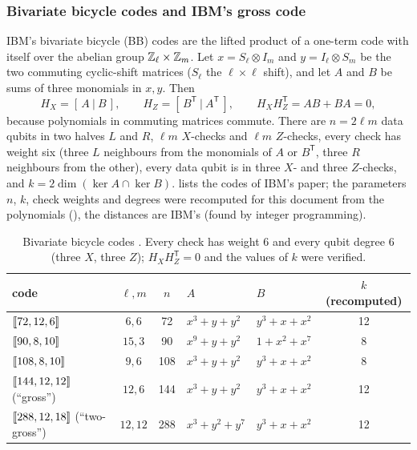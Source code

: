\subsubsection{Bivariate bicycle codes and IBM's gross code}\label{sec:bb}
IBM's bivariate bicycle (BB) codes \cite{bravyi24gross} are the lifted product of a one-term code with itself over the abelian group $\mathbb{Z}_\ell\times\mathbb{Z}_m$. Let $x=S_\ell\otimes I_m$ and $y=I_\ell\otimes S_m$ be the two commuting cyclic-shift matrices ($S_\ell$ the $\ell\times\ell$ shift), and let $A$ and $B$ be sums of three monomials in $x,y$. Then
\begin{equation}\label{eq:bb}
H_X=[\,A\ |\ B\,],\qquad H_Z=[\,B^{\mathsf T}\ |\ A^{\mathsf T}\,],\qquad H_XH_Z^{\mathsf T}=AB+BA=0,
\end{equation}
because polynomials in commuting matrices commute. There are $n=2\ell m$ data qubits in two halves $L$ and $R$, $\ell m$ $X$-checks and $\ell m$ $Z$-checks, every check has weight six (three $L$ neighbours from the monomials of $A$ or $B^{\mathsf T}$, three $R$ neighbours from the other), every data qubit is in three $X$- and three $Z$-checks, and $k=2\dim(\ker A\cap\ker B)$.  lists the codes of IBM's paper; the parameters $n$, $k$, check weights and degrees were recomputed for this document from the polynomials (), the distances are IBM's (found by integer programming).

\begin{table}[H]
\centering\footnotesize
\begin{tabular}{@{}lccllc@{}}
\toprule
code & $\ell,m$ & $n$ & $A$ & $B$ & $k$ (recomputed) \\
\midrule
$[\![72,12,6]\!]$ & $6,6$ & 72 & $x^3+y+y^2$ & $y^3+x+x^2$ & 12\\
$[\![90,8,10]\!]$ & $15,3$ & 90 & $x^9+y+y^2$ & $1+x^2+x^7$ & 8\\
$[\![108,8,10]\!]$ & $9,6$ & 108 & $x^3+y+y^2$ & $y^3+x+x^2$ & 8\\
$[\![144,12,12]\!]$ (``gross'') & $12,6$ & 144 & $x^3+y+y^2$ & $y^3+x+x^2$ & 12\\
$[\![288,12,18]\!]$ (``two-gross'') & $12,12$ & 288 & $x^3+y^2+y^7$ & $y^3+x+x^2$ & 12\\
\bottomrule
\end{tabular}
\caption{Bivariate bicycle codes \cite{bravyi24gross}. Every check has weight $6$ and every qubit degree $6$ (three $X$, three $Z$); $H_XH_Z^{\mathsf T}=0$ and the values of $k$ were verified.}
\label{tab:bb}
\end{table}

